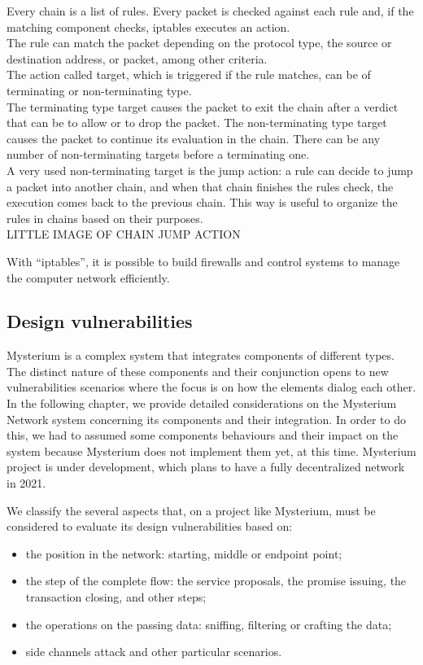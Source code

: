 \documentclass[12pt]{article}
\begin{document}
	Every chain is a list of rules. Every packet is checked against each rule and, if the matching component checks, iptables executes an action.\\
	The rule can match the packet depending on the protocol type, the source or destination address, or packet, among other criteria.\\
	The action called target, which is triggered if the rule matches, can be of terminating or non-terminating type.\\
	The terminating type target causes the packet to exit the chain after a verdict that can be to allow or to drop the packet. The non-terminating type target causes the packet to continue its evaluation in the chain. There can be any number of non-terminating targets before a terminating one.\\
	A very used non-terminating target is the jump action: a rule can decide to jump a packet into another chain, and when that chain finishes the rules check, the execution comes back to the previous chain. This way is useful to organize the rules in chains based on their purposes.\\

	LITTLE IMAGE OF CHAIN JUMP ACTION

	With ``iptables'', it is possible to build firewalls and control systems to manage the computer network efficiently.


	\subsection{Design vulnerabilities}

	Mysterium is a complex system that integrates components of different types. The distinct nature of these components and their conjunction opens to new vulnerabilities scenarios where the focus is on how the elements dialog each other.\\
	In the following chapter, we provide detailed considerations on the Mysterium Network system concerning its components and their integration. In order to do this, we had to assumed some components behaviours and their impact on the system because Mysterium does not implement them yet, at this time. Mysterium project is under development, which plans to have a fully decentralized network in 2021. 

	We classify the several aspects that, on a project like Mysterium, must be considered to evaluate its design vulnerabilities based on:
	\begin{itemize}
		\item the position in the network: starting, middle or endpoint point;
		\item the step of the complete flow: the service proposals, the promise issuing, the transaction closing, and other steps;
		\item the operations on the passing data: sniffing, filtering or crafting the data;
		\item side channels attack and other particular scenarios.
	\end{itemize}
	
\end{document}

